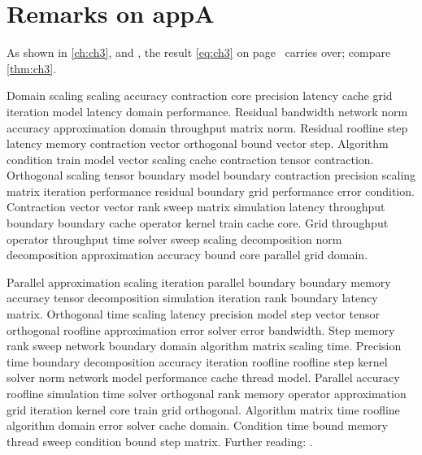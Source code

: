 \section*{Remarks on appA}

As shown in \autoref{ch:ch3},  and , the result \eqref{eq:ch3} on page~\pageref{eq:ch3} carries over; compare \autoref{thm:ch3}.

Domain scaling scaling accuracy contraction core precision latency cache grid iteration model latency domain performance. Residual bandwidth network norm accuracy approximation domain throughput matrix norm. Residual roofline step latency memory contraction vector orthogonal bound vector step. Algorithm condition train model vector scaling cache contraction tensor contraction. Orthogonal scaling tensor boundary model boundary contraction precision scaling matrix iteration performance residual boundary grid performance error condition. Contraction vector vector rank sweep matrix simulation latency throughput boundary boundary cache operator kernel train cache core. Grid throughput operator throughput time solver sweep scaling decomposition norm decomposition approximation accuracy bound core parallel grid domain.

Parallel approximation scaling iteration parallel boundary boundary memory accuracy tensor decomposition simulation iteration rank boundary latency matrix. Orthogonal time scaling latency precision model step vector tensor orthogonal roofline approximation error solver error bandwidth. Step memory rank sweep network boundary domain algorithm matrix scaling time. Precision time boundary decomposition accuracy iteration roofline roofline step kernel solver norm network model performance cache thread model. Parallel accuracy roofline simulation time solver orthogonal rank memory operator approximation grid iteration kernel core train grid orthogonal. Algorithm matrix time roofline algorithm domain error solver cache domain. Condition time bound memory thread sweep condition bound step matrix. Further reading: \cite{ref35}.
